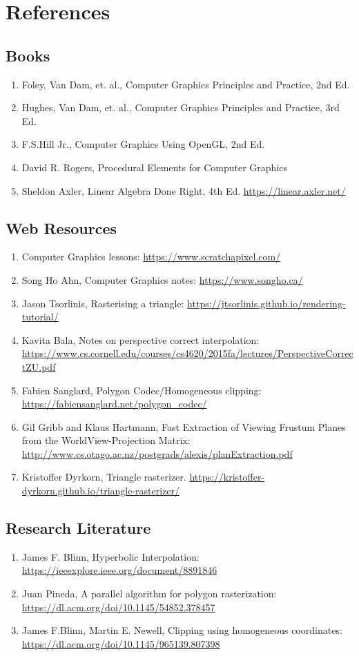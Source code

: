\chapter{References}
\section{Books}
\begin{enumerate}
    \item Foley, Van Dam, et. al., Computer Graphics Principles and Practice, 2nd Ed. 
    \item Hughes, Van Dam, et. al., Computer Graphics Principles and Practice, 3rd Ed. 
    \item F.S.Hill Jr., Computer Graphics Using OpenGL, 2nd Ed.
    \item David R. Rogers, Procedural Elements for Computer Graphics
	\item Sheldon Axler, Linear Algebra Done Right, 4th Ed. \url{https://linear.axler.net/}
\end{enumerate}

\section{Web Resources}
\begin{enumerate}
    \item Computer Graphics lessons: \url{https://www.scratchapixel.com/}
    \item Song Ho Ahn, Computer Graphics notes:  \url{https://www.songho.ca/}
     \item Jason Tsorlinis, Rasterising a triangle: \url{https://jtsorlinis.github.io/rendering-tutorial/}
     \item Kavita Bala, Notes on perspective correct interpolation: \url{https://www.cs.cornell.edu/courses/cs4620/2015fa/lectures/PerspectiveCorrectZU.pdf}
     \item Fabien Sanglard, Polygon Codec/Homogeneous clipping:  \url{https://fabiensanglard.net/polygon_codec/}
	 \item Gil Gribb and Klaus Hartmann, Fast Extraction of Viewing Frustum Planes from the WorldView-Projection Matrix: \url{http://www.cs.otago.ac.nz/postgrads/alexis/planExtraction.pdf}
	 \item Kristoffer Dyrkorn, Triangle rasterizer. \url{https://kristoffer-dyrkorn.github.io/triangle-rasterizer/}
\end{enumerate}

\section{Research Literature}
\begin{enumerate}
    \item James F. Blinn, Hyperbolic Interpolation: \url{https://ieeexplore.ieee.org/document/8891846}
     \item Juan Pineda, A parallel algorithm for polygon rasterization: \url{https://dl.acm.org/doi/10.1145/54852.378457}
      \item James F.Blinn, Martin E. Newell,  Clipping using homogeneous coordinates: \url{https://dl.acm.org/doi/10.1145/965139.807398}
\end{enumerate}

